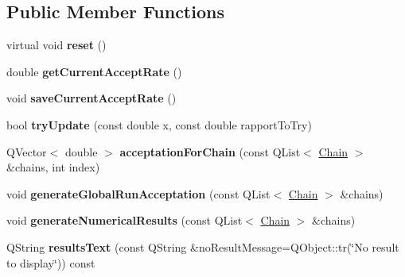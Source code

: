 \subsection*{Public Member Functions}
\begin{DoxyCompactItemize}
\item 
\hypertarget{class_m_h_variable_a9868230ee04bb515120988e1a23e213b}{virtual void {\bfseries reset} ()}\label{class_m_h_variable_a9868230ee04bb515120988e1a23e213b}

\item 
\hypertarget{class_m_h_variable_afdaa6d25361c70829f386eb40ccae549}{double {\bfseries get\-Current\-Accept\-Rate} ()}\label{class_m_h_variable_afdaa6d25361c70829f386eb40ccae549}

\item 
\hypertarget{class_m_h_variable_adea3e2f3269d22bc66663289f82d2183}{void {\bfseries save\-Current\-Accept\-Rate} ()}\label{class_m_h_variable_adea3e2f3269d22bc66663289f82d2183}

\item 
\hypertarget{class_m_h_variable_a5297f47794323c19c474ac9dbade6fb8}{bool {\bfseries try\-Update} (const double x, const double rapport\-To\-Try)}\label{class_m_h_variable_a5297f47794323c19c474ac9dbade6fb8}

\item 
\hypertarget{class_m_h_variable_a2494664e87aed31fe7f16e49891638db}{Q\-Vector$<$ double $>$ {\bfseries acceptation\-For\-Chain} (const Q\-List$<$ \hyperlink{struct_chain}{Chain} $>$ \&chains, int index)}\label{class_m_h_variable_a2494664e87aed31fe7f16e49891638db}

\item 
\hypertarget{class_m_h_variable_a3140c86d9d5af39f2c3fb10dad9256c5}{void {\bfseries generate\-Global\-Run\-Acceptation} (const Q\-List$<$ \hyperlink{struct_chain}{Chain} $>$ \&chains)}\label{class_m_h_variable_a3140c86d9d5af39f2c3fb10dad9256c5}

\item 
\hypertarget{class_m_h_variable_a5157a853616d6dbe6bf49a6465339213}{void {\bfseries generate\-Numerical\-Results} (const Q\-List$<$ \hyperlink{struct_chain}{Chain} $>$ \&chains)}\label{class_m_h_variable_a5157a853616d6dbe6bf49a6465339213}

\item 
\hypertarget{class_m_h_variable_ab275eb7f598937d4f7d1c179402763c1}{Q\-String {\bfseries results\-Text} (const Q\-String \&no\-Result\-Message=Q\-Object\-::tr(\char`\"{}No result to display\char`\"{})) const }\label{class_m_h_variable_ab275eb7f598937d4f7d1c179402763c1}

\end{DoxyCompactItemize}

